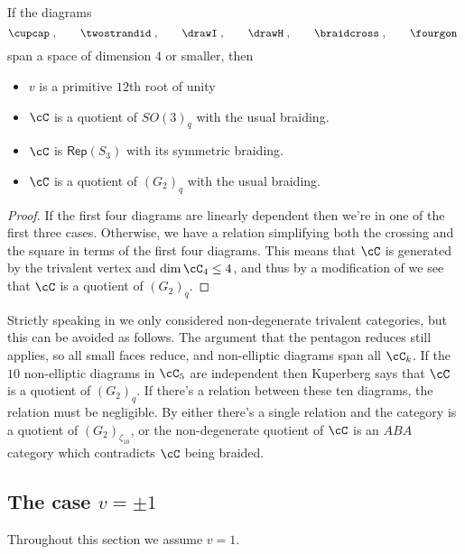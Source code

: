 \documentclass[12pt]{amsart}
\begin{document}
\begin{proposition} \label{prop:dim4}
If the diagrams  
  \[
  \cupcap\;,\qquad\twostrandid\;,
    \qquad\drawI\;,\qquad\drawH\;,\qquad\braidcross\;,\qquad\fourgon\;
   \]
span a space of dimension $4$ or smaller, then
\begin{itemize}
\item $v$ is a primitive $12$th root of unity
\item $\cC$ is a quotient of $SO(3)_q$ with the usual braiding.
\item $\cC$ is $\mathsf{Rep}(S_3)$ with its symmetric braiding.
\item $\cC$ is a quotient of $(G_2)_q$ with the usual braiding.  
\end{itemize}
\end{proposition}
\begin{proof}
If the first four diagrams are linearly dependent then we're in one of the
first three cases.  Otherwise, we have a relation simplifying both the
crossing and the square in terms of the first four diagrams.  This means that
$\cC$ is generated by the trivalent vertex and $\dim \cC_4 \leq 4$, and thus
by a modification of \cite[\S 5]{MR3624901} we see that $\cC$ is a
quotient of $(G_2)_q$.
\end{proof}

\begin{remark}
Strictly speaking in \cite{MR3624901} we only considered non-degenerate trivalent categories, but this can be avoided as follows.  The argument that the pentagon reduces still applies, so all small faces reduce, and non-elliptic diagrams span all $\cC_k$.  If the $10$ non-elliptic diagrams in $\cC_5$ are independent then Kuperberg \cite{MR1265145} says that $\cC$ is a quotient of $(G_2)_q$.  If there's a relation between these ten diagrams, the relation must be negligible.  By \cite{MR3624901} either there's a single relation and the category is a quotient of $(G_2)_{\zeta_{10}}$, or the non-degenerate quotient of $\cC$ is an $ABA$ category which contradicts $\cC$ being braided.
\end{remark}



\subsection{The case \texorpdfstring{$v = \pm 1$}{v = pm 1}}

Throughout this section we assume $v=1$.
\end{document}
